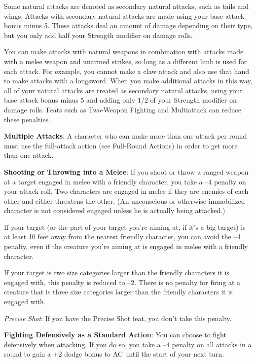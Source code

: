 Some natural attacks are denoted as secondary natural attacks, such as tails and wings. Attacks with secondary natural attacks are made using your base attack bonus minus 5. These attacks deal an amount of damage depending on their type, but you only add half your Strength modifier on damage rolls.
				
 You can make attacks with natural weapons in combination with attacks made with a melee weapon and unarmed strikes, so long as a different limb is used for each attack. For example, you cannot make a claw attack and also use that hand to make attacks with a longsword. When you make additional attacks in this way, all of your natural attacks are treated as secondary natural attacks, using your base attack bonus minus 5 and adding only 1/2 of your Strength modifier on damage rolls. Feats such as Two-Weapon Fighting and Multiattack can reduce these penalties.
				
\textbf{Multiple Attacks}: A character who can make more than one attack per round must use the full-attack action (see Full-Round Actions) in order to get more than one attack.
				
\textbf{Shooting or Throwing into a Melee}: If you shoot or throw a ranged weapon at a target engaged in melee with a friendly character, you take a --4 penalty on your attack roll. Two characters are engaged in melee if they are enemies of each other and either threatens the other. (An unconscious or otherwise immobilized character is not considered engaged unless he is actually being attacked.)
				
If your target (or the part of your target you're aiming at, if it's a big target) is at least 10 feet away from the nearest friendly character, you can avoid the --4 penalty, even if the creature you're aiming at is engaged in melee with a friendly character. 
				
If your target is two size categories larger than the friendly characters it is engaged with, this penalty is reduced to --2. There is no penalty for firing at a creature that is three size categories larger than the friendly characters it is engaged with.
				
\textit{Precise Shot}: If you have the Precise Shot feat, you don't take this penalty.
				
\textbf{Fighting Defensively as a Standard Action}: You can choose to fight defensively when attacking. If you do so, you take a --4 penalty on all attacks in a round to gain a +2 dodge bonus to AC until the start of your next turn.
				
